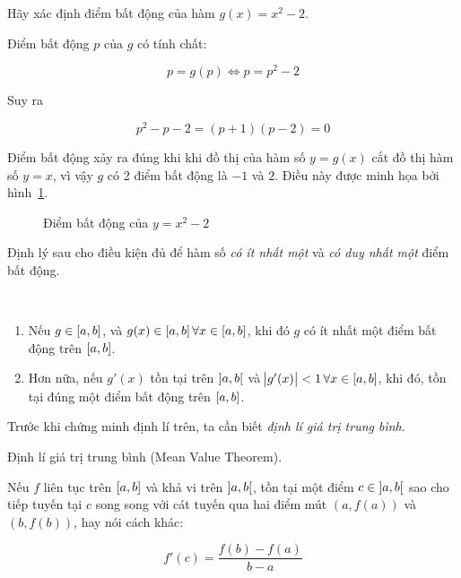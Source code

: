 \documentclass[../../Lectures.tex]{subfiles}
\begin{document}
\begin{exmp}
    Hãy xác định điểm bất động của hàm \(g(x) = x^2 - 2\).

    Điểm bất động \(p\) của \(g\) có tính chất:

    \[p= g(p) \iff p = p^2 - 2\]

    Suy ra

    \[p^2 - p - 2 = (p + 1)(p - 2) = 0\]

    Điểm bất động xảy ra đúng khi khi đồ thị của hàm số \(y = g(x)\) cắt đồ thị
    hàm số \(y = x\), vì vậy \(g\) có 2 điểm bất động là \(-1\) và \(2\). Điều
    này được minh họa bởi hình~\ref{fig:exmp_2.2_fixed_point}.

    \begin{figure}[!h]
        \centering
        
        \caption{Điểm bất động của \(y = x^2 - 2\)}
        \label{fig:exmp_2.2_fixed_point}
    \end{figure}
\end{exmp}

Định lý sau cho điều kiện đủ để hàm số \emph{có ít nhất một} và \emph{có duy
nhất một} điểm bất động.

\begin{theorem}\label{thm:1}
\phantom\\
\begin{enumerate}
    \item Nếu \(g \in \interval{a}{b}\), và \(g(x) \in \interval{a}{b} \,
        \forall x \in \interval{a}{b}\), khi đó \(g\) có ít nhất một điểm bất
        động trên \(\interval{a}{b}\).
    \item Hơn nữa, nếu \(g'(x)\) tồn tại trên \(\interval[open]{a}{b}\) và
        \(\abs{g'(x)} < 1 \, \forall x \in \interval{a}{b}\), khi đó, tồn tại
        đúng một điểm bất động trên \(\interval{a}{b}\).
\end{enumerate}
\end{theorem}

Trước khi chứng minh định lí trên, ta cần biết \emph{định lí giá trị trung
bình}.

\begin{theorem}\label{thm:mean_value_theorem}
    Định lí giá trị trung bình (Mean Value Theorem).

    Nếu \(f\) liên tục trên \(\interval{a}{b}\) và khả vi trên
    \(\interval[open]{a}{b}\), tồn tại một điểm \(c \in \interval[open]{a}{b}\)
    sao cho tiếp tuyến tại \(c\) song song với cát tuyến qua hai điểm mút \((a,
    f(a))\) và \((b, f(b))\), hay nói cách khác:

    \[f'(c) = \frac{f(b) - f(a)}{b - a}\]
\end{theorem}
\end{document}
